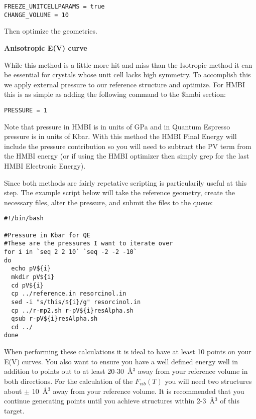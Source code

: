 \documentclass[11pt,letterpaper]{article}
\begin{document}
\begin{spacing}{1.0}
\begin{verbatim}
FREEZE_UNITCELLPARAMS = true
CHANGE_VOLUME = 10
\end{verbatim}

Then optimize the geometries.

\textbf{Anisotropic E(V) curve}

\vspace{2mm}
While this method is a little more hit and miss than the Isotropic method it can be essential for crystals whose unit cell lacks high symmetry. To accomplish this we apply external pressure to our reference structure and optimize. For HMBI this is as simple as adding the following command to the \$hmbi section:

\begin{verbatim}
PRESSURE = 1
\end{verbatim}

Note that pressure in HMBI is in units of GPa and in Quantum Espresso pressure is in units of Kbar. With this method the HMBI Final Energy will include the pressure contribution so you will need to subtract the PV term from the HMBI energy (or if using the HMBI optimizer then simply grep for the last HMBI Electronic Energy).

Since both methods are fairly repetative scripting is particularily useful at this step. The example script below will take the reference geometry, create the necessary files, alter the pressure, and submit the files to the queue:

\begin{verbatim}
#!/bin/bash

#Pressure in Kbar for QE
#These are the pressures I want to iterate over
for i in `seq 2 2 10` `seq -2 -2 -10`
do
  echo pV${i}
  mkdir pV${i}
  cd pV${i}
  cp ../reference.in resorcinol.in
  sed -i "s/this/${i}/g" resorcinol.in
  cp ../r-mp2.sh r-pV${i}resAlpha.sh
  qsub r-pV${i}resAlpha.sh
  cd ../
done
\end{verbatim}

When performing these calculations it is ideal to have at least 10 points on your E(V) curves. You also want to ensure you have a well defined energy well in addition to points out to at least 20-30~\AA$^3$ away from your reference volume in both directions. For the calculation of the $F_{vib}(T)$ you will need two structures about $\pm$ 10~\AA$^3$ away from your reference volume. It is recommended that you continue generating points until you achieve structures within 2-3~\AA$^3$ of this target.


\end{spacing}
\end{document}
